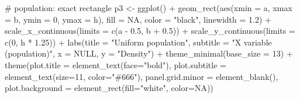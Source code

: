 \documentclass[
  letterpaper,
  DIV=11,
  numbers=noendperiod]{scrreprt}
\newenvironment{Shaded}{\begin{snugshade}}{\end{snugshade}}
\newcommand{\AttributeTok}[1]{\textcolor[rgb]{0.40,0.45,0.13}{#1}}
\newcommand{\CommentTok}[1]{\textcolor[rgb]{0.37,0.37,0.37}{#1}}
\newcommand{\ConstantTok}[1]{\textcolor[rgb]{0.56,0.35,0.01}{#1}}
\newcommand{\DecValTok}[1]{\textcolor[rgb]{0.68,0.00,0.00}{#1}}
\newcommand{\FloatTok}[1]{\textcolor[rgb]{0.68,0.00,0.00}{#1}}
\newcommand{\FunctionTok}[1]{\textcolor[rgb]{0.28,0.35,0.67}{#1}}
\newcommand{\NormalTok}[1]{\textcolor[rgb]{0.00,0.23,0.31}{#1}}
\newcommand{\OtherTok}[1]{\textcolor[rgb]{0.00,0.23,0.31}{#1}}
\newcommand{\SpecialCharTok}[1]{\textcolor[rgb]{0.37,0.37,0.37}{#1}}
\newcommand{\StringTok}[1]{\textcolor[rgb]{0.13,0.47,0.30}{#1}}
\begin{document}
\begin{Shaded}
\begin{Highlighting}[]
\CommentTok{\# population: exact rectangle}
\NormalTok{p3 }\OtherTok{\textless{}{-}} \FunctionTok{ggplot}\NormalTok{() }\SpecialCharTok{+}
  \FunctionTok{geom\_rect}\NormalTok{(}\FunctionTok{aes}\NormalTok{(}\AttributeTok{xmin =}\NormalTok{ a, }\AttributeTok{xmax =}\NormalTok{ b, }\AttributeTok{ymin =} \DecValTok{0}\NormalTok{, }\AttributeTok{ymax =}\NormalTok{ h),}
            \AttributeTok{fill =} \ConstantTok{NA}\NormalTok{, }\AttributeTok{color =} \StringTok{"black"}\NormalTok{, }\AttributeTok{linewidth =} \FloatTok{1.2}\NormalTok{) }\SpecialCharTok{+}
  \FunctionTok{scale\_x\_continuous}\NormalTok{(}\AttributeTok{limits =} \FunctionTok{c}\NormalTok{(a }\SpecialCharTok{{-}} \FloatTok{0.5}\NormalTok{, b }\SpecialCharTok{+} \FloatTok{0.5}\NormalTok{)) }\SpecialCharTok{+}
  \FunctionTok{scale\_y\_continuous}\NormalTok{(}\AttributeTok{limits =} \FunctionTok{c}\NormalTok{(}\DecValTok{0}\NormalTok{, h }\SpecialCharTok{*} \FloatTok{1.25}\NormalTok{)) }\SpecialCharTok{+}
  \FunctionTok{labs}\NormalTok{(}\AttributeTok{title =} \StringTok{"Uniform population"}\NormalTok{,}
       \AttributeTok{subtitle =} \StringTok{"X variable (population)"}\NormalTok{,}
       \AttributeTok{x =} \ConstantTok{NULL}\NormalTok{, }\AttributeTok{y =} \StringTok{"Density"}\NormalTok{) }\SpecialCharTok{+}
  \FunctionTok{theme\_minimal}\NormalTok{(}\AttributeTok{base\_size =} \DecValTok{13}\NormalTok{) }\SpecialCharTok{+}
  \FunctionTok{theme}\NormalTok{(}\AttributeTok{plot.title =} \FunctionTok{element\_text}\NormalTok{(}\AttributeTok{face=}\StringTok{"bold"}\NormalTok{),}
        \AttributeTok{plot.subtitle =} \FunctionTok{element\_text}\NormalTok{(}\AttributeTok{size=}\DecValTok{11}\NormalTok{, }\AttributeTok{color=}\StringTok{"\#666"}\NormalTok{),}
        \AttributeTok{panel.grid.minor =} \FunctionTok{element\_blank}\NormalTok{(),}
        \AttributeTok{plot.background =} \FunctionTok{element\_rect}\NormalTok{(}\AttributeTok{fill=}\StringTok{"white"}\NormalTok{, }\AttributeTok{color=}\ConstantTok{NA}\NormalTok{))}


\end{Highlighting}
\end{Shaded}
\end{document}
